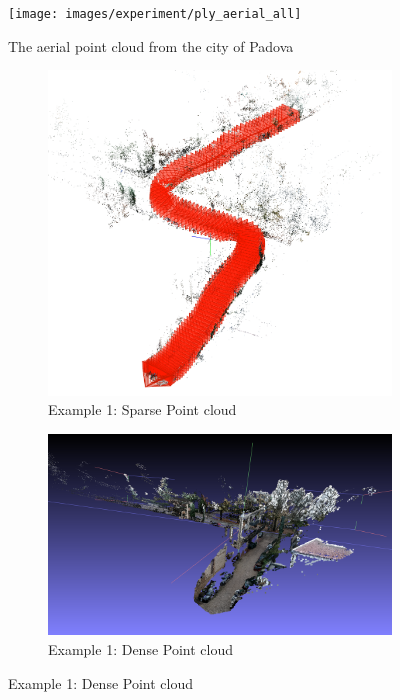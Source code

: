 \documentclass[11pt]{article}
\begin{document}
    \begin{figure}
    \centering
    \texttt{[image: images/experiment/ply\_aerial\_all]}
    \caption{The aerial point cloud from the city of Padova}
    \label{fig:ply_aerial_all}
    \end{figure}

    \begin{figure}
        \centering
        \begin{subfigure}{0.45\textwidth}
            \centering
            \includegraphics[width=\linewidth]{images/method/sfm_sparse_1}
            \caption{Example 1: Sparse Point cloud}
        \end{subfigure}
        \hfill
        \begin{subfigure}{0.45\textwidth}
            \centering
            \includegraphics[width=\linewidth]{images/method/sfm_dense_1}
            \caption{Example 1: Dense Point cloud}
        \end{subfigure}


\end{figure}
\end{document}
